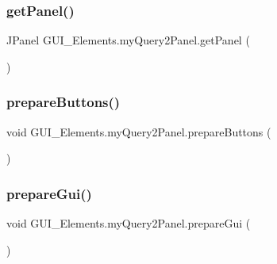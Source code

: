 \hypertarget{class_g_u_i___elements_1_1my_query2_panel_a45bac12608ab0c76e4583fad0aa17cb0}{}\label{class_g_u_i___elements_1_1my_query2_panel_a45bac12608ab0c76e4583fad0aa17cb0} 
\subsubsection{\texorpdfstring{get\+Panel()}{getPanel()}}
{\footnotesize\ttfamily J\+Panel G\+U\+I\+\_\+\+Elements.\+my\+Query2\+Panel.\+get\+Panel (\begin{DoxyParamCaption}{ }\end{DoxyParamCaption})}

\hypertarget{class_g_u_i___elements_1_1my_query2_panel_a71b3714eb5b1a303b8229ef240415524}{}\label{class_g_u_i___elements_1_1my_query2_panel_a71b3714eb5b1a303b8229ef240415524} 
\subsubsection{\texorpdfstring{prepare\+Buttons()}{prepareButtons()}}
{\footnotesize\ttfamily void G\+U\+I\+\_\+\+Elements.\+my\+Query2\+Panel.\+prepare\+Buttons (\begin{DoxyParamCaption}{ }\end{DoxyParamCaption})}

\hypertarget{class_g_u_i___elements_1_1my_query2_panel_ad99535b063e2d3ff044560245837eecf}{}\label{class_g_u_i___elements_1_1my_query2_panel_ad99535b063e2d3ff044560245837eecf} 
\subsubsection{\texorpdfstring{prepare\+Gui()}{prepareGui()}}
{\footnotesize\ttfamily void G\+U\+I\+\_\+\+Elements.\+my\+Query2\+Panel.\+prepare\+Gui (\begin{DoxyParamCaption}{ }\end{DoxyParamCaption})}

